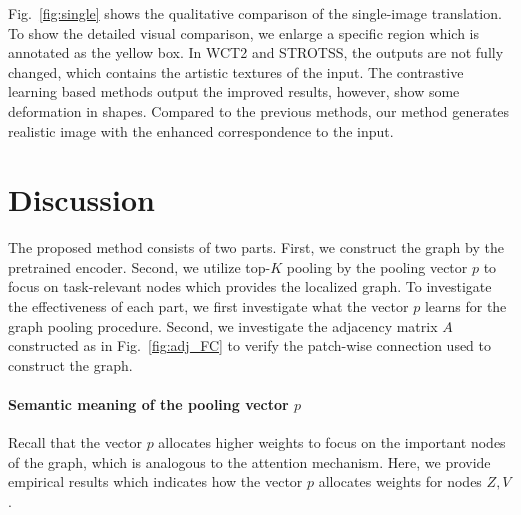 \documentclass[letterpaper]{article} %
\begin{document}
Fig.~\ref{fig:single} shows the qualitative comparison of the single-image translation. To show the detailed visual comparison, we enlarge a specific region which is annotated as the yellow box. In WCT2 and STROTSS, the outputs are not fully changed, which contains the artistic textures of the input. The contrastive learning based methods output the improved results, however, show some deformation in shapes. 
Compared to the previous methods, our method generates realistic image with the enhanced correspondence to the input. 

\section{Discussion}

The proposed method consists of two parts. First, we construct the graph by the pretrained encoder. Second, we utilize top-$K$ pooling by the pooling vector $p$ to focus on task-relevant nodes which provides the localized graph. 
To investigate the effectiveness of each part, we first investigate what the vector $p$ learns for the graph pooling procedure. 
Second, we investigate the adjacency matrix $A$ constructed as in Fig.~\ref{fig:adj_FC}
to verify the patch-wise connection used to construct the graph.

% 


\paragraph{Semantic meaning of the pooling vector $p$ }
Recall that the vector $p$ allocates higher weights to focus on the important nodes of the graph, which is analogous to the attention mechanism. 
Here, we provide empirical results which indicates how the vector $p$ allocates weights for nodes $Z, V$.
\end{document}
